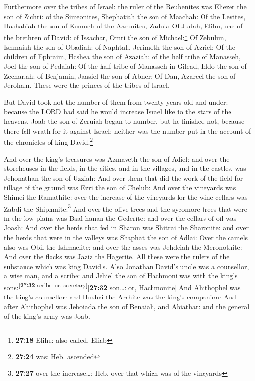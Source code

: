  Furthermore over the tribes of Israel: the ruler of the
Reubenites was Eliezer the son of Zichri: of the Simeonites, Shephatiah
the son of Maachah:  Of the Levites, Hashabiah the son of
Kemuel: of the Aaronites, Zadok:  Of Judah, Elihu, one of
the brethren of David: of Issachar, Omri the son of Michael:\footnote{\textbf{27:18}
  Elihu: also called, Eliab}  Of Zebulun, Ishmaiah the
son of Obadiah: of Naphtali, Jerimoth the son of Azriel: 
Of the children of Ephraim, Hoshea the son of Azaziah: of the half tribe
of Manasseh, Joel the son of Pedaiah:  Of the half tribe
of Manasseh in Gilead, Iddo the son of Zechariah: of Benjamin, Jaasiel
the son of Abner:  Of Dan, Azareel the son of Jeroham.
These were the princes of the tribes of Israel.

 But David took not the number of them from twenty years
old and under: because the LORD had said he would increase Israel like
to the stars of the heavens.  Joab the son of Zeruiah
began to number, but he finished not, because there fell wrath for it
against Israel; neither was the number put in the account of the
chronicles of king David.\footnote{\textbf{27:24} was: Heb. ascended}

 And over the king's treasures was Azmaveth the son of
Adiel: and over the storehouses in the fields, in the cities, and in the
villages, and in the castles, was Jehonathan the son of Uzziah:
 And over them that did the work of the field for tillage
of the ground was Ezri the son of Chelub:  And over the
vineyards was Shimei the Ramathite: over the increase of the vineyards
for the wine cellars was Zabdi the Shiphmite:\footnote{\textbf{27:27}
  over the increase\ldots: Heb. over that which was of the vineyards}
 And over the olive trees and the sycomore trees that
were in the low plains was Baal-hanan the Gederite: and over the cellars
of oil was Joash:  And over the herds that fed in Sharon
was Shitrai the Sharonite: and over the herds that were in the valleys
was Shaphat the son of Adlai:  Over the camels also was
Obil the Ishmaelite: and over the asses was Jehdeiah the Meronothite:
 And over the flocks was Jaziz the Hagerite. All these
were the rulers of the substance which was king David's. 
Also Jonathan David's uncle was a counsellor, a wise man, and a scribe:
and Jehiel the son of Hachmoni was with the king's
sons:\textsuperscript{{[}\textbf{27:32} scribe: or,
secretary{]}}{[}\textbf{27:32} son\ldots: or, Hachmonite{]}
 And Ahithophel was the king's counsellor: and Hushai the
Archite was the king's companion:  And after Ahithophel
was Jehoiada the son of Benaiah, and Abiathar: and the general of the
king's army was Joab.

